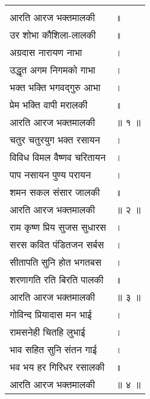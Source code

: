{{\begin{longtable}[l]{@{\hspace*{\mylen}}>{\setlength\parfillskip{0pt}}p{\mylenone}@{}@{}l@{}}
 & \\[-\the\mylentwo]
आरति आरज भक्तमालकी & ॥\\ \nopagebreak
उर शोभा कौशिला-लालकी & ॥\\
अग्रदास नारायण नाभा & ।\\ \nopagebreak
उद्धृत अगम निगमको गाभा & ।\\
भक्त भक्ति भगवद्गुरु आभा & ।\\ \nopagebreak
प्रेम भक्ति वापी मरालकी & ॥\\ \nopagebreak
आरति आरज भक्तमालकी & ॥ १ ॥\\
चतुर चतुरयुग भक्त रसायन & ।\\ \nopagebreak
विविध विमल वैष्णव चरितायन & ।\\
पाप नसायन पुण्य परायन & ।\\ \nopagebreak
शमन सकल संसार जालकी & ॥\\ \nopagebreak
आरति आरज भक्तमालकी & ॥ २ ॥\\
राम कृष्ण प्रिय सुजस सुधारस & ।\\ \nopagebreak
सरस कवित पंडितजन सर्बस & ।\\
सीतापति सुनि होत भगतबस & ।\\ \nopagebreak
शरणागति रति बिरति पालकी & ॥\\ \nopagebreak
आरति आरज भक्तमालकी & ॥ ३ ॥\\
गोविन्द प्रियादास मन भाई & ।\\ \nopagebreak
रामसनेही चितहि लुभाई & ।\\
भाव सहित सुनि संतन गाई & ।\\ \nopagebreak
भव भय हर गिरिधर रसालकी & ॥\\ \nopagebreak
आरति आरज भक्तमालकी & ॥ ४ ॥\\
\end{longtable}
}
}
\paraseplotus
